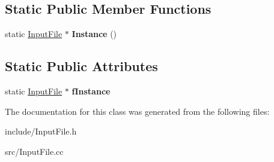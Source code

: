 \subsection*{Static Public Member Functions}
\begin{DoxyCompactItemize}
\item 
\hypertarget{classInputFile_acd483270b7e4223f2a655c7badb5736a}{static \hyperlink{classInputFile}{Input\+File} $\ast$ {\bfseries Instance} ()}\label{classInputFile_acd483270b7e4223f2a655c7badb5736a}

\end{DoxyCompactItemize}
\subsection*{Static Public Attributes}
\begin{DoxyCompactItemize}
\item 
\hypertarget{classInputFile_ae5318f9a5f1d3d68e3d3f67388c6090f}{static \hyperlink{classInputFile}{Input\+File} $\ast$ {\bfseries f\+Instance}}\label{classInputFile_ae5318f9a5f1d3d68e3d3f67388c6090f}

\end{DoxyCompactItemize}


The documentation for this class was generated from the following files\+:\begin{DoxyCompactItemize}
\item 
include/Input\+File.\+h\item 
src/Input\+File.\+cc\end{DoxyCompactItemize}
